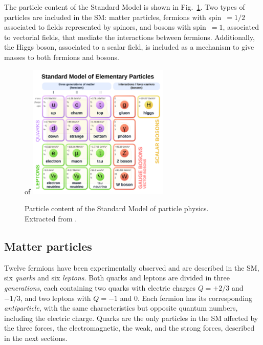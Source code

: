 \documentclass[../main.tex]{subfiles}
\begin{document}
The particle content of the Standard Model is shown in Fig.~\ref{theo:fig:sm}. Two types of particles are included in the SM: matter particles, fermions with spin~$=1/2$ associated to fields represented by spinors, and bosons with spin~$=1$, associated to vectorial fields, that mediate the interactions between fermions. Additionally, the Higgs boson, associated to a scalar field, is included as a mechanism to give masses to both fermions and bosons.

\begin{figure}[h!]
\begin{center}
of \includegraphics[width=0.6\textwidth]{Images/Standard_Model_of_Elementary_Particles}
\end{center}
\caption{Particle content of the Standard Model of particle physics. Extracted from \cite{intro:theo:sm_pic}. }
\label{theo:fig:sm}
\end{figure}




\subsection{Matter particles}

Twelve fermions have been experimentally observed and are described in the SM, six \textit{quarks} and six \textit{leptons}. Both quarks and leptons are divided in three \textit{generations}, each containing two quarks with electric charges $Q=+2/3$ and $-1/3$, and two leptons with $Q=-1$ and $0$. Each fermion has its corresponding \textit{antiparticle}, with the same characteristics but opposite quantum numbers, including the electric charge. Quarks are the only particles in the SM affected by the three forces, the electromagnetic, the weak, and the strong forces, described in the next sections. 
\end{document}
